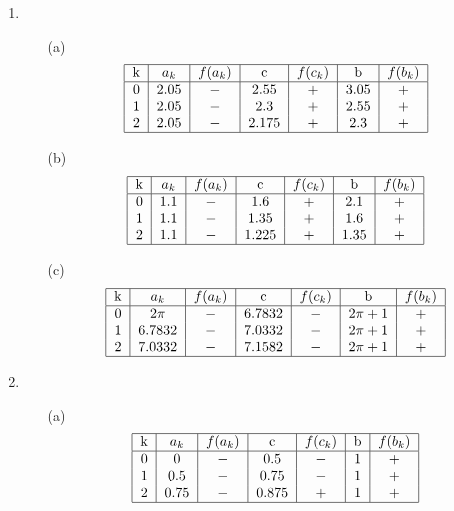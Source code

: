 \documentclass[UTF8]{ctexart}
\begin{document}
\begin{enumerate}
\begin{itemize}
\end{itemize}

\item \begin{itemize}
\item[(a)]
\[
\begin{tabular}{|r|c|c|c|c|c|c|}
\hline
k & $a_k$ & $f(a_k)$ & c    & $f(c_k)$ & b    & $f(b_k)$ \\
\hline
0 & 2.05  & $-$      & 2.55 & $+$      & 3.05 & $+$ \\
1 & 2.05  & $-$      & 2.3  & $+$      & 2.55 & $+$ \\
2 & 2.05  & $-$      & 2.175& $+$      & 2.3  & $+$ \\
\hline
\end{tabular}
\]

\item[(b)]
\[
\begin{tabular}{|r|c|c|c|c|c|c|}
\hline
k & $a_k$ & $f(a_k)$ & c    & $f(c_k)$ & b    & $f(b_k)$ \\
\hline
0 & 1.1   & $-$      & 1.6  & $+$      & 2.1  & $+$ \\
1 & 1.1   & $-$      & 1.35 & $+$      & 1.6  & $+$ \\
2 & 1.1   & $-$      & 1.225& $+$      & 1.35 & $+$ \\
\hline
\end{tabular}
\]

\item[(c)]
\[
\begin{tabular}{|r|c|c|c|c|c|c|}
\hline
k & $a_k$ & $f(a_k)$ & c       & $f(c_k)$ & b        & $f(b_k)$ \\
\hline
0 & $2\pi$& $-$      & 6.7832  & $-$      & $2\pi+1$ & $+$ \\
1 & 6.7832& $-$      & 7.0332  & $-$      & $2\pi+1$ & $+$ \\
2 & 7.0332& $-$      & 7.1582  & $-$      & $2\pi+1$ & $+$ \\
\hline
\end{tabular}
\]

\end{itemize}

\item \begin{itemize}
\item[(a)]
\[
\begin{tabular}{|r|c|c|c|c|c|c|}
\hline
k & $a_k$ & $f(a_k)$ & c       & $f(c_k)$ & b    & $f(b_k)$ \\
\hline
0 & 0     & $-$      & 0.5     & $-$      & 1    & $+$ \\
1 & 0.5   & $-$      & 0.75    & $-$      & 1    & $+$ \\
2 & 0.75  & $-$      & 0.875   & $+$      & 1    & $+$ \\
\hline
\end{tabular}
\]


\end{itemize}
\end{enumerate}
\end{document}
